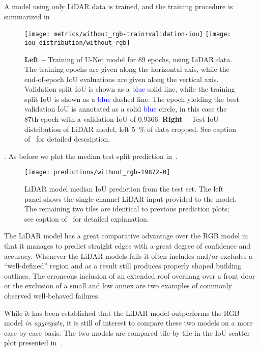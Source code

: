 A model using only LiDAR data is trained, and the training procedure is summarized in~.
\begin{figure}[H]
  \centering
  \texttt{[image: metrics/without\_rgb-train+validation-iou]}
  \texttt{[image: iou\_distribution/without\_rgb]}
  \caption{%
    \textbf{Left --} Training of U-Net model for 89 epochs, using LiDAR data.
    The training epochs are given along the horizontal axis, while the end-of-epoch IoU evaluations are given along the vertical axis.
    Validation split IoU is shown as a \textcolor{blue}{blue} solid line, while the training split IoU is shown as a \textcolor{blue}{blue} dashed line.
    The epoch yielding the best validation IoU is annotated as a solid \textcolor{blue}{blue} circle, in this case the 87th epoch with a validation IoU of \num{0.9366}.
    \textbf{Right --} Test IoU distribution of LiDAR model, left \SI{5}{\percent} of data cropped.
    See caption of~ for detailed description.
  }%
  \label{fig:lidar-training}
\end{figure}

.
As before we plot the median test split prediction in~.

\begin{figure}[H]
  \centering
  \texttt{[image: predictions/without\_rgb-19872-0]}  %
  \caption{%
    LiDAR model median IoU prediction from the test set.
    The left panel shows the single-channel LiDAR input provided to the model.
    The remaining two tiles are identical to previous prediction plots; see caption of~ for detailed explanation.
  }%
  \label{fig:lidar-median-prediction}
\end{figure}

The LiDAR model has a great comparative advantage over the RGB model in that it manages to predict straight edges with a great degree of confidence and accuracy.
Whenever the LiDAR models fails it often includes and/or excludes a \enquote{well-defined} region and as a result still produces properly shaped building outlines.
The erroneous inclusion of an extended roof overhang over a front door or the exclusion of a small and low annex are two examples of commonly observed well-behaved failures.

While it has been established that the LiDAR model outperforms the RGB model \emph{in aggregate}, it is still of interest to compare these two models on a more case-by-case basis.
The two models are compared tile-by-tile in the IoU scatter plot presented in~.

